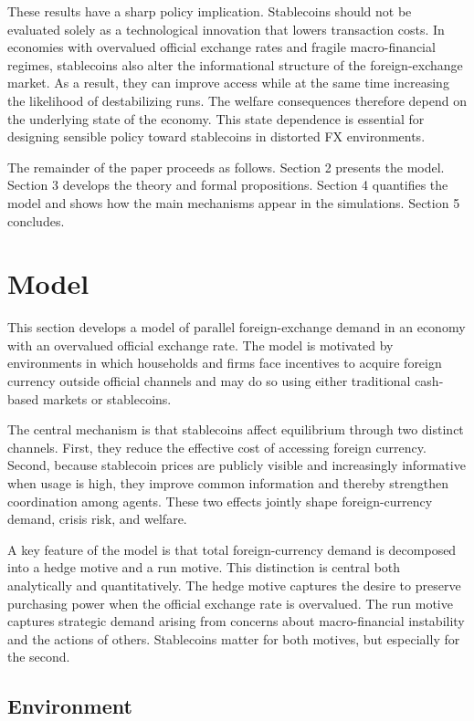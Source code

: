 \documentclass[12pt]{article}
\begin{document}
These results have a sharp policy implication. Stablecoins should not be evaluated solely as a technological innovation that lowers transaction costs. In economies with overvalued official exchange rates and fragile macro-financial regimes, stablecoins also alter the informational structure of the foreign-exchange market. As a result, they can improve access while at the same time increasing the likelihood of destabilizing runs. The welfare consequences therefore depend on the underlying state of the economy. This state dependence is essential for designing sensible policy toward stablecoins in distorted FX environments.

The remainder of the paper proceeds as follows. Section 2 presents the model. Section 3 develops the theory and formal propositions. Section 4 quantifies the model and shows how the main mechanisms appear in the simulations. Section 5 concludes.

\section{Model}

This section develops a model of parallel foreign-exchange demand in an economy with an overvalued official exchange rate. The model is motivated by environments in which households and firms face incentives to acquire foreign currency outside official channels and may do so using either traditional cash-based markets or stablecoins.

The central mechanism is that stablecoins affect equilibrium through two distinct channels. First, they reduce the effective cost of accessing foreign currency. Second, because stablecoin prices are publicly visible and increasingly informative when usage is high, they improve common information and thereby strengthen coordination among agents. These two effects jointly shape foreign-currency demand, crisis risk, and welfare.

A key feature of the model is that total foreign-currency demand is decomposed into a hedge motive and a run motive. This distinction is central both analytically and quantitatively. The hedge motive captures the desire to preserve purchasing power when the official exchange rate is overvalued. The run motive captures strategic demand arising from concerns about macro-financial instability and the actions of others. Stablecoins matter for both motives, but especially for the second.

\subsection{Environment}
\end{document}
